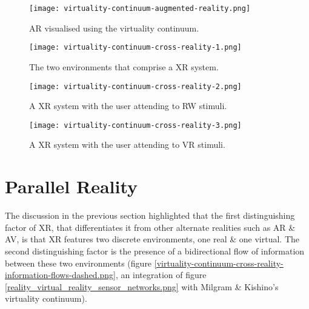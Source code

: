 \begin{figure}[h]
	\begin{center}
		\texttt{[image: virtuality-continuum-augmented-reality.png]}
		\caption{AR visualised using the virtuality continuum.}
		\label{virtuality-continuum-augmented-reality}
	\end{center}
\end{figure}

\begin{figure}[h]
	\begin{center}
		\texttt{[image: virtuality-continuum-cross-reality-1.png]}
		\caption{The two environments that comprise a XR system.}
		\label{virtuality-continuum-cross-reality-1}
	\end{center}
\end{figure}

\begin{figure}[h]
	\begin{center}
		\texttt{[image: virtuality-continuum-cross-reality-2.png]}
		\caption{A XR system with the user attending to RW stimuli.}
		\label{virtuality-continuum-cross-reality-2}
	\end{center}
\end{figure}

\begin{figure}[h]
	\begin{center}
		\texttt{[image: virtuality-continuum-cross-reality-3.png]}
		\caption{A XR system with the user attending to VR stimuli.}
		\label{virtuality-continuum-cross-reality-3}
	\end{center}
\end{figure}

\section{Parallel Reality}

\newcommand{\PRfootnote}{\footnote{Note that the use of `PR' in the quotation in section \ref{subsec_HyperReality} is a reference to `physical reality' (that author's term for what this thesis simply calls `reality') \& is not a reference to parallel reality.}}

The discussion in the previous section highlighted that the first distinguishing factor of XR, that differentiates it from other alternate realities such as AR \& AV, is that XR features two discrete environments, one real \& one virtual. The second distinguishing factor is the presence of a bidirectional flow of information between these two environments (figure \ref{virtuality-continuum-cross-reality-information-flows-dashed.png}, an integration of figure \ref{reality_virtual_reality_sensor_networks.png} with Milgram \& Kishino's virtuality continuum).

